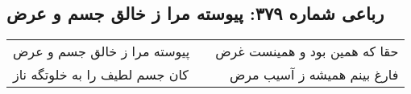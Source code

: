 \begin{center}
\section*{رباعی شماره ۳۷۹: پیوسته مرا ز خالق جسم و عرض}
\label{sec:sh379}
\begin{longtable}{l p{0.5cm} r}
پیوسته مرا ز خالق جسم و عرض
&&
حقا که همین بود و همینست غرض
\\
کان جسم لطیف را به خلوتگه ناز
&&
فارغ بینم همیشه ز آسیب مرض
\\
\end{longtable}
\end{center}

